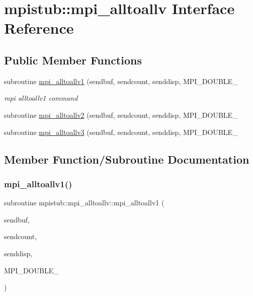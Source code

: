 \hypertarget{interfacempistub_1_1mpi__alltoallv}{}\section{mpistub\+::mpi\+\_\+alltoallv Interface Reference}
\label{interfacempistub_1_1mpi__alltoallv}
\subsection*{Public Member Functions}
\begin{DoxyCompactItemize}
\item 
subroutine \mbox{\hyperlink{interfacempistub_1_1mpi__alltoallv_abfd52403de6b265e6b5fbd2561bfa652}{mpi\+\_\+alltoallv1}} (sendbuf, sendcount, senddisp, M\+P\+I\+\_\+\+D\+O\+U\+B\+L\+E\+\_\+
\begin{DoxyCompactList}\small\item\em mpi alltoallv1 command \end{DoxyCompactList}\item 
subroutine \mbox{\hyperlink{interfacempistub_1_1mpi__alltoallv_aa4b7552839c6f8cf7f1305392fac3d35}{mpi\+\_\+alltoallv2}} (sendbuf, sendcount, senddisp, M\+P\+I\+\_\+\+D\+O\+U\+B\+L\+E\+\_\+
\item 
subroutine \mbox{\hyperlink{interfacempistub_1_1mpi__alltoallv_a0772d04d3569130dbea35245d97cfae7}{mpi\+\_\+alltoallv3}} (sendbuf, sendcount, senddisp, M\+P\+I\+\_\+\+D\+O\+U\+B\+L\+E\+\_\+
\end{DoxyCompactItemize}


\subsection{Member Function/\+Subroutine Documentation}
\mbox{\label{interfacempistub_1_1mpi__alltoallv_abfd52403de6b265e6b5fbd2561bfa652}} 
\subsubsection{\texorpdfstring{mpi\_alltoallv1()}{mpi\_alltoallv1()}}
{\footnotesize\ttfamily subroutine mpistub\+::mpi\+\_\+alltoallv\+::mpi\+\_\+alltoallv1 (\begin{DoxyParamCaption}\item[{double complex, dimension(\+:)}]{sendbuf,  }\item[{integer, dimension(\+:)}]{sendcount,  }\item[{integer, dimension(\+:)}]{senddisp,  }\item[{}]{M\+P\+I\+\_\+\+D\+O\+U\+B\+L\+E\+\_\+ }\end{DoxyParamCaption})}



